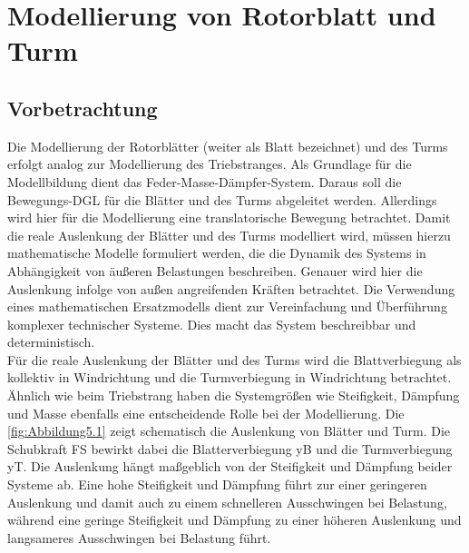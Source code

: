 \section{Modellierung von Rotorblatt und Turm} \label{turm_blatt}

\subsection{Vorbetrachtung}
Die Modellierung der Rotorblätter (weiter als Blatt bezeichnet) und des Turms erfolgt analog zur Modellierung des Triebstranges. Als Grundlage für die Modellbildung dient das Feder-Masse-Dämpfer-System. Daraus soll die Bewegungs-DGL für die Blätter und des Turms abgeleitet werden. Allerdings wird hier für die Modellierung eine translatorische Bewegung betrachtet. Damit die reale Auslenkung der Blätter und des Turms modelliert wird, müssen hierzu mathematische Modelle formuliert werden, die die Dynamik des Systems in Abhängigkeit von äußeren Belastungen beschreiben. Genauer wird hier die Auslenkung infolge von außen angreifenden Kräften betrachtet. Die Verwendung eines mathematischen Ersatzmodells dient zur Vereinfachung und Überführung komplexer technischer Systeme. Dies macht das System beschreibbar und deterministisch. 
\\
Für die reale Auslenkung der Blätter und des Turms wird die Blattverbiegung als kollektiv in Windrichtung und die Turmverbiegung in Windrichtung betrachtet. Ähnlich wie beim Triebstrang haben die Systemgrößen wie Steifigkeit, Dämpfung und Masse ebenfalls eine entscheidende Rolle bei der Modellierung. Die \autoref{fig:Abbildung5.1} zeigt schematisch die Auslenkung von Blätter und Turm. Die Schubkraft \acs{FS} bewirkt dabei die Blatterverbiegung \acs{yB} und die Turmverbiegung \acs{yT}. Die Auslenkung hängt maßgeblich von der Steifigkeit und Dämpfung beider Systeme ab. Eine hohe Steifigkeit und Dämpfung führt zur einer geringeren Auslenkung und damit auch zu einem schnelleren Ausschwingen bei Belastung, während eine geringe Steifigkeit und Dämpfung zu einer höheren Auslenkung und langsameres Ausschwingen bei Belastung führt.
